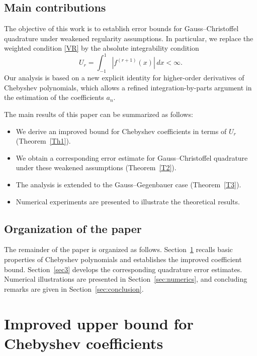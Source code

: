 \documentclass[12pt,a4paper]{article}
\begin{document}
\subsection*{Main contributions}
The objective of this work is to establish error bounds for Gauss--Christoffel quadrature under weakened regularity assumptions. In particular, we replace the weighted condition \eqref{VR} by the absolute integrability condition
\begin{equation}\label{Ur}
U_r=\int_{-1}^{1}|f^{(r+1)}(x)|\,dx<\infty.
\end{equation}
Our analysis is based on a new explicit identity for higher-order derivatives of Chebyshev polynomials, which allows a refined integration-by-parts argument in the estimation of the coefficients \(a_n\).

The main results of this paper can be summarized as follows:
\begin{itemize}
    \item We derive an improved bound for Chebyshev coefficients in terms of \(U_r\) (Theorem~\ref{Th1}).
    \item We obtain a corresponding error estimate for Gauss--Christoffel quadrature under these weakened assumptions (Theorem~\ref{T2}).
    \item The analysis is extended to the Gauss--Gegenbauer case (Theorem~\ref{T3}).
    \item Numerical experiments are presented to illustrate the theoretical results.
\end{itemize}

\subsection*{Organization of the paper}
The remainder of the paper is organized as follows. Section~\ref{sec1} recalls basic properties of Chebyshev polynomials and establishes the improved coefficient bound. Section~\ref{sec3} develops the corresponding quadrature error estimates. Numerical illustrations are presented in Section~\ref{sec:numerics}, and concluding remarks are given in Section~\ref{sec:conclusion}.

\section{Improved upper bound for Chebyshev coefficients}\label{sec1}
\end{document}
